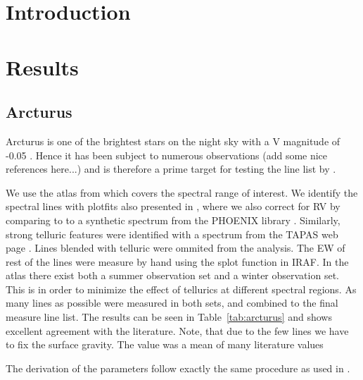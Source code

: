 \documentclass{aa}
\begin{document}
\maketitle



\section{Introduction}
\label{sec:introduction}


\section{Results}
\label{sec:results}



\subsection{Arcturus}
\label{sec:derived_parameters_of_the_sun}
Arcturus is one of the brightest stars on the night sky with a V magnitude of
-0.05 \citep{Ducati2002}. Hence it has been subject to numerous observations
(add some nice references here...) and is therefore a prime target for testing
the line list by \cite{Andreasen2016}.

We use the atlas from \cite{Hinkle2003} which covers the spectral range of
interest. We identify the spectral lines with plot\textunderscore{}fits also presented in
\cite{Andreasen2016}, where we also correct for RV by comparing to to a
synthetic spectrum from the PHOENIX library \citep{Husser2013}. Similarly,
strong telluric features were identified with a spectrum from the TAPAS
web page \citep{Bertaux2014}. Lines blended with telluric were ommited
from the analysis. The EW of rest of the lines were measure by hand using the
splot function in IRAF. In the atlas there exist both a summer observation
set and a winter observation set. This is in order to minimize the effect of
tellurics at different spectral regions. As many lines as possible were
measured in both sets, and combined to the final measure line list.
The results can be seen in Table~\ref{tab:arcturus} and shows excellent
agreement with the literature. Note, that due to the few  lines
we have to fix the surface gravity. The value was a mean of many literature
values

The derivation of the parameters follow exactly the same procedure as used
in \cite{Andreasen2016}.
\end{document}

